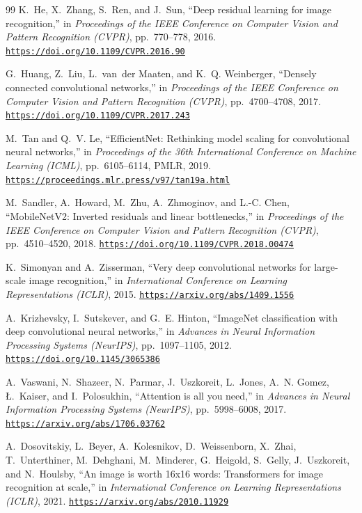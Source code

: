 \documentclass[11pt,a4paper]{article}
\newcommand{\paperurl}[1]{\href{#1}{\underline{\nolinkurl{#1}}}}
\begin{document}
\begin{thebibliography}{99}
K.~He, X.~Zhang, S.~Ren, and J.~Sun,
\newblock ``Deep residual learning for image recognition,''
\newblock in \emph{Proceedings of the IEEE Conference on Computer Vision and Pattern Recognition (CVPR)}, pp.~770--778, 2016.
\newblock \paperurl{https://doi.org/10.1109/CVPR.2016.90}

G.~Huang, Z.~Liu, L.~van~der Maaten, and K.~Q. Weinberger,
\newblock ``Densely connected convolutional networks,''
\newblock in \emph{Proceedings of the IEEE Conference on Computer Vision and Pattern Recognition (CVPR)}, pp.~4700--4708, 2017.
\newblock \paperurl{https://doi.org/10.1109/CVPR.2017.243}

M.~Tan and Q.~V. Le,
\newblock ``EfficientNet: Rethinking model scaling for convolutional neural networks,''
\newblock in \emph{Proceedings of the 36th International Conference on Machine Learning (ICML)}, pp.~6105--6114, PMLR, 2019.
\newblock \paperurl{https://proceedings.mlr.press/v97/tan19a.html}

M.~Sandler, A.~Howard, M.~Zhu, A.~Zhmoginov, and L.-C. Chen,
\newblock ``MobileNetV2: Inverted residuals and linear bottlenecks,''
\newblock in \emph{Proceedings of the IEEE Conference on Computer Vision and Pattern Recognition (CVPR)}, pp.~4510--4520, 2018.
\newblock \paperurl{https://doi.org/10.1109/CVPR.2018.00474}

K.~Simonyan and A.~Zisserman,
\newblock ``Very deep convolutional networks for large-scale image recognition,''
\newblock in \emph{International Conference on Learning Representations (ICLR)}, 2015.
\newblock \paperurl{https://arxiv.org/abs/1409.1556}

A.~Krizhevsky, I.~Sutskever, and G.~E. Hinton,
\newblock ``ImageNet classification with deep convolutional neural networks,''
\newblock in \emph{Advances in Neural Information Processing Systems (NeurIPS)}, pp.~1097--1105, 2012.
\newblock \paperurl{https://doi.org/10.1145/3065386}

A.~Vaswani, N.~Shazeer, N.~Parmar, J.~Uszkoreit, L.~Jones, A.~N. Gomez, \L{}.~Kaiser, and I.~Polosukhin,
\newblock ``Attention is all you need,''
\newblock in \emph{Advances in Neural Information Processing Systems (NeurIPS)}, pp.~5998--6008, 2017.
\newblock \paperurl{https://arxiv.org/abs/1706.03762}

A.~Dosovitskiy, L.~Beyer, A.~Kolesnikov, D.~Weissenborn, X.~Zhai, T.~Unterthiner, M.~Dehghani, M.~Minderer, G.~Heigold, S.~Gelly, J.~Uszkoreit, and N.~Houlsby,
\newblock ``An image is worth 16x16 words: Transformers for image recognition at scale,''
\newblock in \emph{International Conference on Learning Representations (ICLR)}, 2021.
\newblock \paperurl{https://arxiv.org/abs/2010.11929}


\end{thebibliography}
\end{document}
